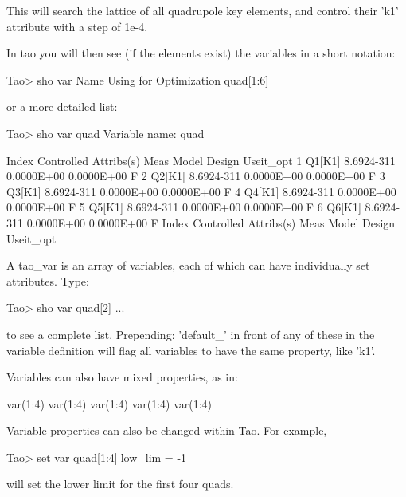 \documentclass{hitec}
\begin{document}
This will search the lattice of all quadrupole key elements, and control their 'k1' attribute with a step of 1e-4.

In tao you will then see (if the elements exist) the variables in a short notation:
\begin{code}
Tao> sho var
       Name                                      Using for Optimization
    quad[1:6]
\end{code}

or a more detailed list:
\begin{code}
Tao> sho var quad
Variable name:  quad

 Index  Controlled Attribs(s)    Meas         Model        Design  Useit_opt
     1  Q1[K1]               8.6924-311    0.0000E+00    0.0000E+00       F
     2  Q2[K1]               8.6924-311    0.0000E+00    0.0000E+00       F
     3  Q3[K1]               8.6924-311    0.0000E+00    0.0000E+00       F
     4  Q4[K1]               8.6924-311    0.0000E+00    0.0000E+00       F
     5  Q5[K1]               8.6924-311    0.0000E+00    0.0000E+00       F
     6  Q6[K1]               8.6924-311    0.0000E+00    0.0000E+00       F
 Index  Controlled Attribs(s)    Meas         Model        Design  Useit_opt
\end{code}

A tao_var is an array of variables, each of which can have individually set attributes. Type: 
\begin{code}
Tao> sho var quad[2]
...
\end{code}

to see a complete list. Prepending: 'default_' in front of any of these in the variable definition
will flag all variables to have the same property, like 'k1'.

Variables can also have mixed properties, as in:
\begin{code}
var(1:4)%
var(1:4)%
var(1:4)%
var(1:4)%
var(1:4)%
\end{code}

Variable properties can also be changed within Tao. For example, 
\begin{code}
Tao> set var quad[1:4]|low_lim = -1
\end{code}
will set the lower limit for the first four quads.
\end{document}
